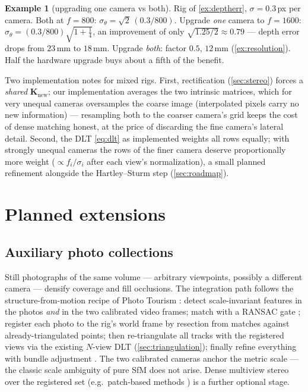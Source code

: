 \documentclass[11pt]{article}
\theoremstyle{definition}
\newtheorem{example}{Example}
\newcommand{\mat}[1]{\mathbf{#1}}
\newcommand{\K}{\mat{K}}
\begin{document}
\begin{example}[upgrading one camera vs both]
\label{ex:hetero}
Rig of \autoref{ex:deptherr}, $\sigma=0.3$\,px per camera. Both at
$f=800$: $\sigma_\theta=\sqrt2\,(0.3/800)$. Upgrade \emph{one} camera to
$f=1600$: $\sigma_\theta=(0.3/800)\sqrt{1+\tfrac14}$, an improvement of
only $\sqrt{1.25/2}\approx0.79$ --- depth error drops from $23$\,mm to
$18$\,mm. Upgrade \emph{both}: factor $0.5$, $12$\,mm
(\autoref{ex:resolution}). Half the hardware upgrade buys about a fifth of
the benefit.
\end{example}

Two implementation notes for mixed rigs. First, rectification
(\autoref{sec:stereo}) forces a \emph{shared} $\K_{\mathrm{new}}$; our
implementation averages the two intrinsic matrices, which for very unequal
cameras oversamples the coarse image (interpolated pixels carry no new
information) --- resampling both to the coarser camera's grid keeps the
cost of dense matching honest, at the price of discarding the fine
camera's lateral detail. Second, the DLT \eqref{eq:dlt} as implemented
weights all rows equally; with strongly unequal cameras the rows of the
finer camera deserve proportionally more weight ($\propto f_i/\sigma_i$
after each view's normalization), a small planned refinement alongside the
Hartley--Sturm step (\autoref{sec:roadmap}).

\section{Planned extensions}
\label{sec:extensions}

\subsection{Auxiliary photo collections}
\label{sec:photos}

Still photographs of the same volume --- arbitrary viewpoints, possibly a
different camera --- densify coverage and fill occlusions. The integration
path follows the structure-from-motion recipe of Photo Tourism
\cite{Snavely2006}: detect scale-invariant features \cite{Lowe2004} in the
photos \emph{and} in the two calibrated video frames; match with a RANSAC
gate \cite{FischlerBolles1981}; register each photo to the rig's world frame
by resection from matches against already-triangulated points; then
re-triangulate all tracks with the registered views via the existing
$N$-view DLT (\autoref{sec:triangulation}); finally refine everything with
bundle adjustment \cite{Triggs2000}. The two calibrated cameras anchor the
metric scale --- the classic scale ambiguity of pure SfM does not arise.
Dense multiview stereo over the registered set (e.g.\ patch-based methods
\cite{FurukawaPonce2010}) is a further optional stage.
\end{document}
